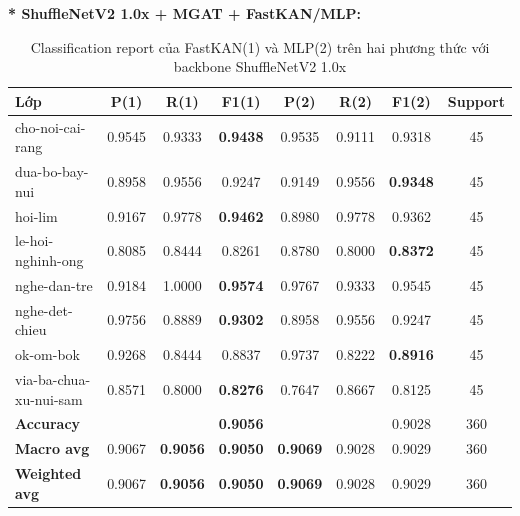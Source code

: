 \textbf{* ShuffleNetV2 1.0x + MGAT + FastKAN/MLP:}
\begin{table}[H]
\centering
\renewcommand{\arraystretch}{1.08}
\caption{\centering Classification report của FastKAN(1) và MLP(2) trên hai phương thức với backbone ShuffleNetV2 1.0x}
\begin{tabular}{lccccccc}
\hline \textbf{Lớp} & \textbf{P(1)} & \textbf{R(1)} & \textbf{F1(1)} & \textbf{P(2)} & \textbf{R(2)} & \textbf{F1(2)} & \textbf{Support} \\ \hline

cho-noi-cai-rang
& 0.9545 & 0.9333 & \textbf{0.9438}
& 0.9535 & 0.9111 & 0.9318 & 45 \\

dua-bo-bay-nui
& 0.8958 & 0.9556 & 0.9247
& 0.9149 & 0.9556 & \textbf{0.9348} & 45 \\

hoi-lim
& 0.9167 & 0.9778 & \textbf{0.9462}
& 0.8980 & 0.9778 & 0.9362 & 45 \\

le-hoi-nghinh-ong
& 0.8085 & 0.8444 & 0.8261
& 0.8780 & 0.8000 & \textbf{0.8372} & 45 \\

nghe-dan-tre
& 0.9184 & 1.0000 & \textbf{0.9574}
& 0.9767 & 0.9333 & 0.9545 & 45 \\

nghe-det-chieu
& 0.9756 & 0.8889 & \textbf{0.9302}
& 0.8958 & 0.9556 & 0.9247 & 45 \\

ok-om-bok
& 0.9268 & 0.8444 & 0.8837
& 0.9737 & 0.8222 & \textbf{0.8916} & 45 \\

via-ba-chua-xu-nui-sam
& 0.8571 & 0.8000 & \textbf{0.8276}
& 0.7647 & 0.8667 & 0.8125 & 45 \\
\hline

\textbf{Accuracy}
& & & \textbf{0.9056}
& & & 0.9028 & 360 \\

\textbf{Macro avg}
& 0.9067 & \textbf{0.9056} & \textbf{0.9050}
& \textbf{0.9069} & 0.9028 & 0.9029 & 360 \\

\textbf{Weighted avg}
& 0.9067 & \textbf{0.9056} & \textbf{0.9050}
& \textbf{0.9069} & 0.9028 & 0.9029 & 360 \\
\hline
\end{tabular}
\end{table}

